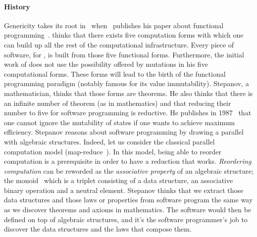 \paragraph{History} Genericity takes its root in~
when~\citeauthor{backus.1978.functional} publishes his paper about functional
programming~\parencite{backus.1978.functional}. \citeauthor{backus.1978.functional} thinks that there exists five
computation forms with which one can build up all the rest of the computational infrastructure. Every piece of software,
for \citeauthor{backus.1978.functional}, is built from those five functional forms. Furthermore, the initial work of
\citeauthor{backus.1978.functional} does not use the possibility offered by mutations in his five computational forms.
These forms will lead to the birth of the functional programming paradigm (notably famous for its value immutability).
Stepanov, a mathematician, thinks that those forms are theorems. He also thinks that there is an infinite number of
theorem (as in mathematics) and that reducing their number to five for software programming is reductive. He publishes
in 1987~\parencite{stepanov.1987.higher} that one cannot ignore the mutability of states if one wants to achieve maximum
efficiency. Stepanov reasons about software programming by drawing a parallel with algebraic structures. Indeed, let us
consider the classical parallel computation model (map-reduce~\parencite{dean.2008.mapreduce}). In this model, being
able to reorder computation is a prerequisite in order to have a reduction that works. \emph{Reordering computation} can
be reworded as the \emph{associative property} of an algebraic structure; the monoid~\parencite{dean.2019.monoids} which
is a triplet consisting of a data structure, an associative binary operation and a neutral element. Stepanov thinks that
we extract those data structures and those laws or properties from software program the same way as we discover theorems
and axioms in mathematics. The software would then be defined on top of algebraic structures, and it's the software
programmer's job to discover the data structures and the laws that compose them.

